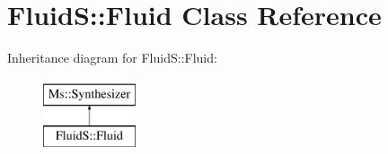 \hypertarget{class_fluid_s_1_1_fluid}{}\section{FluidS\+:\+:Fluid Class Reference}
\label{class_fluid_s_1_1_fluid}
Inheritance diagram for FluidS\+:\+:Fluid\+:\begin{figure}[H]
\begin{center}
\leavevmode
\includegraphics[height=2.000000cm]{class_fluid_s_1_1_fluid}
\end{center}
\end{figure}
